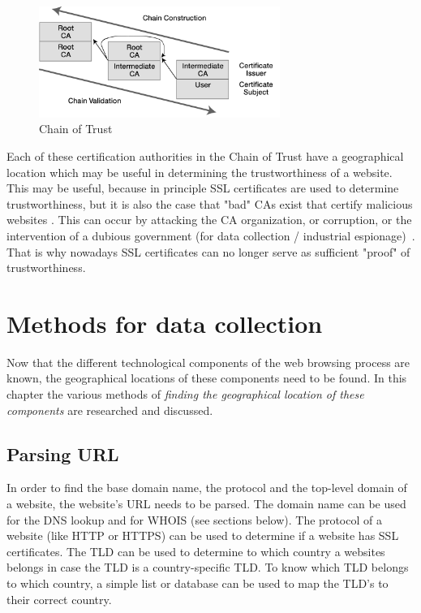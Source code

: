 \documentclass[twoside,openright,notitlepage]{uva-bachelor-thesis}
\begin{document}
\begin{figure}[h!]
    \centering
    \includegraphics[width=0.7\textwidth]{img/chain_of_trust.png}
    \caption{Chain of Trust}
    \label{fig:cot}
\end{figure}

Each of these certification authorities in the Chain of Trust have a geographical location which may be useful in determining the trustworthiness of a website. This may be useful, because in principle SSL certificates are used to determine trustworthiness, but it is also the case that "bad" CAs exist that certify malicious websites . This can occur by attacking the CA organization, or corruption, or the intervention of a dubious government (for data collection / industrial espionage)~\cite{wsj}. That is why nowadays SSL certificates can no longer serve as sufficient "proof" of trustworthiness.


\FloatBarrier
\chapter{Methods for data collection}
Now that the different technological components of the web browsing process are known, the geographical locations of these components need to be found. In this chapter the various methods of \emph{finding the geographical location of these components} are researched and discussed.

\section{Parsing URL}
In order to find the base domain name, the protocol and the top-level domain of a website, the website's URL needs to be parsed. The domain name can be used for the DNS lookup and for WHOIS (see sections below). The protocol of a website (like HTTP or HTTPS) can be used to determine if a website has SSL certificates. The TLD can be used to determine to which country a websites belongs in case the TLD is a country-specific TLD. To know which TLD belongs to which country, a simple list or database can be used to map the TLD's to their correct country.
\end{document}
